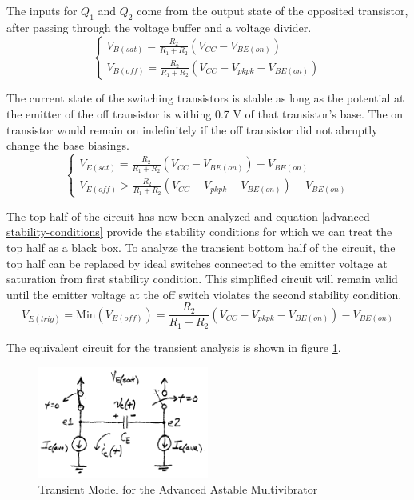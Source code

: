 \documentclass[titlepage, letterpaper, 10.5pt]{article}
\begin{document}
The inputs for $Q_{1}$ and $Q_{2}$ come from the output state of the opposited transistor,
after passing through the voltage buffer and a voltage divider.
\begin{equation*}
\left\{\begin{array}{lr}
V_{B(sat)}=\frac{R_{2}}{R_{1}+R_{2}}(V_{CC}-V_{BE(on)})	\\
V_{B(off)}=\frac{R_{2}}{R_{1}+R_{2}}(V_{CC}-V_{pkpk}-V_{BE(on)})
\end{array}\right.
\end{equation*}

The current state of the switching transistors is stable as long as
the potential at the emitter of the off transistor is withing 0.7 V of
that transistor's base. The on transistor would remain on indefinitely
if the off transistor did not abruptly change the base biasings.
\begin{equation}
\left\{\begin{array}{lr}
V_{E(sat)}=\frac{R_{2}}{R_{1}+R_{2}}(V_{CC}-V_{BE(on)})-V_{BE(on)}	\\
V_{E(off)}>\frac{R_{2}}{R_{1}+R_{2}}(V_{CC}-V_{pkpk}-V_{BE(on)})-V_{BE(on)}
\end{array}\right.
\label{advanced-stability-conditions}
\end{equation}

The top half of the circuit has now been analyzed and equation
\ref{advanced-stability-conditions} provide the stability conditions for
which we can treat the top half as a black box. To analyze the transient
bottom half of the circuit, the top half can be replaced by ideal switches
connected to the emitter voltage at saturation from first stability condition.
This simplified circuit will remain valid until the emitter voltage at the off
switch violates the second stability condition.
\begin{equation}
V_{E(trig)}=\textrm{Min}(V_{E(off)})=\frac{R_{2}}{R_{1}+R_{2}}(V_{CC}-V_{pkpk}-V_{BE(on)})-V_{BE(on)}
\end{equation}

The equivalent circuit for the transient analysis is shown in figure
\ref{advanced-transient-circuit}.

\begin{figure}[ht]
	\centering
	\includegraphics[width=0.5\textwidth]{diagrams/advanced-transient-circuit}
	\caption{Transient Model for the Advanced Astable Multivibrator}
	\label{advanced-transient-circuit}
\end{figure}
\end{document}
